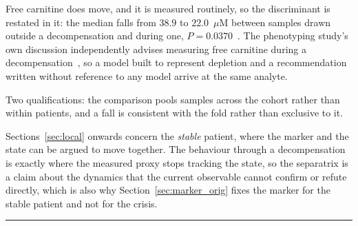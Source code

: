 Free carnitine does move, and it is measured routinely, so the discriminant is restated in
it: the median falls from $38.9$ to $22.0$~$\mu$M between samples drawn outside a
decompensation and during one, $P = 0.0370$~\cite{amd_phenotyping}. %
The phenotyping study's own discussion independently advises measuring free carnitine during
a decompensation~\cite{amd_phenotyping}, %
so a model built to represent depletion and a recommendation written without reference to
any model arrive at the same analyte.

Two qualifications: the comparison pools
samples across the cohort rather than within patients, and a fall is consistent with the
fold rather than exclusive to it.

\begin{remark}[Scope]
\label{rem:scope}
Sections~\ref{sec:local} onwards concern the \emph{stable} patient, where the marker and the
state can be argued to move together. The behaviour through a decompensation is exactly
where the measured proxy stops tracking the state, so the separatrix is a claim about the
dynamics that the current observable cannot confirm or refute directly, which is also why
Section~\ref{sec:marker_orig} fixes the marker for the stable patient and not for the crisis.
\end{remark}

\vspace{0.5em}
\hrule
\vspace{1em}

